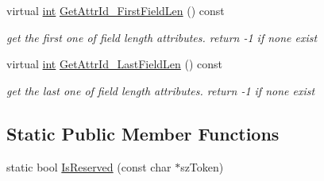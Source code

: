 \begin{DoxyCompactItemize}
virtual \hyperlink{sphinxexpr_8cpp_a4a26e8f9cb8b736e0c4cbf4d16de985e}{int} \hyperlink{classCSphSchema_a791a6c4e72482b22c8b093bea71e7db4}{Get\-Attr\-Id\-\_\-\-First\-Field\-Len} () const 
\begin{DoxyCompactList}\small\item\em get the first one of field length attributes. return -\/1 if none exist \end{DoxyCompactList}\item 
virtual \hyperlink{sphinxexpr_8cpp_a4a26e8f9cb8b736e0c4cbf4d16de985e}{int} \hyperlink{classCSphSchema_ab70819471e0c45af4f5747e8699310bf}{Get\-Attr\-Id\-\_\-\-Last\-Field\-Len} () const 
\begin{DoxyCompactList}\small\item\em get the last one of field length attributes. return -\/1 if none exist \end{DoxyCompactList}\end{DoxyCompactItemize}
\subsection*{Static Public Member Functions}
\begin{DoxyCompactItemize}
\item 
static bool \hyperlink{classCSphSchema_ad0111029643a7f688eb05d38228b0423}{Is\-Reserved} (const char $\ast$sz\-Token)
\end{DoxyCompactItemize}
